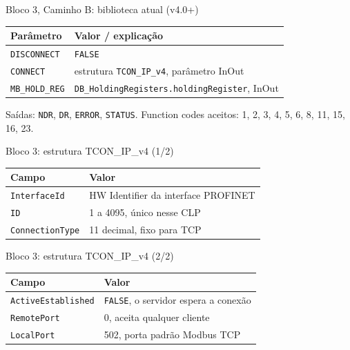 \documentclass[12pt, aspectratio=169]{beamer}
\newcommand{\tblhead}[1]{\textcolor{TextPrimary}{\textbf{#1}}}
\begin{document}
\begin{frame}{Bloco 3, Caminho B: biblioteca atual (v4.0+)}
  \vspace{0.3cm}
  \begin{tabularx}{\textwidth}{@{}l X@{}}
    \rowcolor{PanelEdge}
    \tblhead{Parâmetro} & \tblhead{Valor / explicação} \\
    \midrule
    \rowcolor{PanelBg}
    \texttt{DISCONNECT} & \texttt{FALSE} \\
    \rowcolor{PanelBg}
    \texttt{CONNECT} & estrutura \texttt{TCON\_IP\_v4}, parâmetro InOut \\
    \rowcolor{PanelBg}
    \texttt{MB\_HOLD\_REG} & \texttt{DB\_HoldingRegisters.holdingRegister}, InOut \\
  \end{tabularx}

  \vspace{0.25cm}
  Saídas: \texttt{NDR}, \texttt{DR}, \texttt{ERROR}, \texttt{STATUS}.
  Function codes aceitos: 1, 2, 3, 4, 5, 6, 8, 11, 15, 16, 23.
\end{frame}

\begin{frame}{Bloco 3: estrutura TCON\_IP\_v4 (1/2)}
  \vspace{0.4cm}
  \begin{tabularx}{\textwidth}{@{}l X@{}}
    \rowcolor{PanelEdge}
    \tblhead{Campo} & \tblhead{Valor} \\
    \midrule
    \rowcolor{PanelBg}
    \texttt{InterfaceId} & HW Identifier da interface PROFINET \\
    \rowcolor{PanelBg}
    \texttt{ID} & 1 a 4095, único nesse CLP \\
    \rowcolor{PanelBg}
    \texttt{ConnectionType} & 11 decimal, fixo para TCP \\
  \end{tabularx}
\end{frame}

\begin{frame}{Bloco 3: estrutura TCON\_IP\_v4 (2/2)}
  \vspace{0.4cm}
  \begin{tabularx}{\textwidth}{@{}l X@{}}
    \rowcolor{PanelEdge}
    \tblhead{Campo} & \tblhead{Valor} \\
    \midrule
    \rowcolor{PanelBg}
    \texttt{ActiveEstablished} & \texttt{FALSE}, o servidor espera a conexão \\
    \rowcolor{PanelBg}
    \texttt{RemotePort} & 0, aceita qualquer cliente \\
    \rowcolor{PanelBg}
    \texttt{LocalPort} & 502, porta padrão Modbus TCP \\
  \end{tabularx}
\end{frame}
\end{document}
